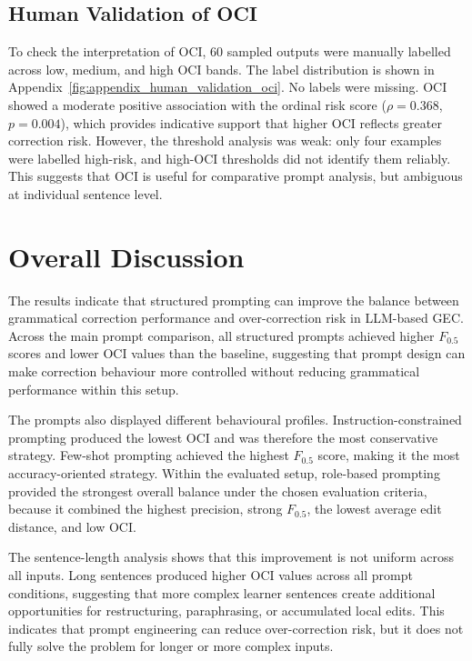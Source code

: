 \subsection{Human Validation of OCI}

To check the interpretation of OCI, 60 sampled outputs were manually labelled across low, medium, and high OCI bands. The label distribution is shown in Appendix~\ref{fig:appendix_human_validation_oci}. No labels were missing. OCI showed a moderate positive association with the ordinal risk score ($\rho = 0.368$, $p = 0.004$), which provides indicative support that higher OCI reflects greater correction risk. However, the threshold analysis was weak: only four examples were labelled high-risk, and high-OCI thresholds did not identify them reliably. This suggests that OCI is useful for comparative prompt analysis, but ambiguous at individual sentence level.

\section{Overall Discussion}

The results indicate that structured prompting can improve the balance between grammatical correction performance and over-correction risk in LLM-based GEC. Across the main prompt comparison, all structured prompts achieved higher $F_{0.5}$ scores and lower OCI values than the baseline, suggesting that prompt design can make correction behaviour more controlled without reducing grammatical performance within this setup.

The prompts also displayed different behavioural profiles. Instruction-constrained prompting produced the lowest OCI and was therefore the most conservative strategy. Few-shot prompting achieved the highest $F_{0.5}$ score, making it the most accuracy-oriented strategy. Within the evaluated setup, role-based prompting provided the strongest overall balance under the chosen evaluation criteria, because it combined the highest precision, strong $F_{0.5}$, the lowest average edit distance, and low OCI.

The sentence-length analysis shows that this improvement is not uniform across all inputs. Long sentences produced higher OCI values across all prompt conditions, suggesting that more complex learner sentences create additional opportunities for restructuring, paraphrasing, or accumulated local edits. This indicates that prompt engineering can reduce over-correction risk, but it does not fully solve the problem for longer or more complex inputs.

